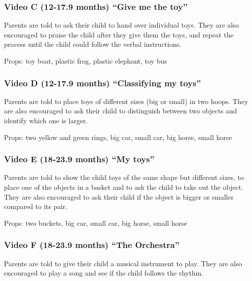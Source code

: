 \documentclass[man,floatsintext]{apa6}
\begin{document}
\begin{appendix}
{\subsubsection{Video C (12-17.9 months) ``Give me the
toy''}\label{video-c-12-17.9-months-give-me-the-toy}}

Parents are told to ask their child to hand over individual toys. They
are also encouraged to praise the child after they give them the toys,
and repeat the process until the child could follow the verbal
instructions.

Props: toy boat, plastic frog, plastic elephant, toy bus

\hypertarget{video-d-12-17.9-months-classifying-my-toys}{%
\subsubsection{Video D (12-17.9 months) ``Classifying my
toys''}\label{video-d-12-17.9-months-classifying-my-toys}}

Parents are told to place toys of different sizes (big or small) in two
hoops. They are also encouraged to ask their child to distinguish
between two objects and identify which one is larger.

Props: two yellow and green rings, big car, small car, big horse, small
horse

\hypertarget{video-e-18-23.9-months-my-toys}{%
\subsubsection{Video E (18-23.9 months) ``My
toys''}\label{video-e-18-23.9-months-my-toys}}

Parents are told to show the child toys of the same shape but different
sizes, to place one of the objects in a basket and to ask the child to
take out the object. They are also encouraged to ask their child if the
object is bigger or smaller compared to its pair.

Props: two buckets, big car, small car, big horse, small horse

\hypertarget{video-f-18-23.9-months-the-orchestra}{%
\subsubsection{Video F (18-23.9 months) ``The
Orchestra''}\label{video-f-18-23.9-months-the-orchestra}}

Parents are told to give their child a musical instrument to play. They
are also encouraged to play a song and see if the child follows the
rhythm.


\end{appendix}
\end{document}
